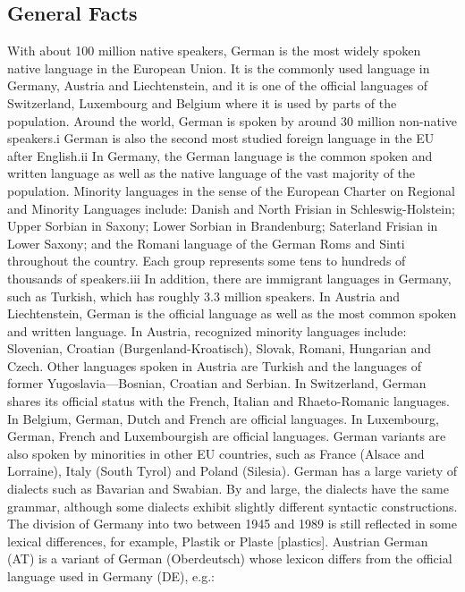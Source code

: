 \documentclass[]{../metanetpaper}
\begin{document}
	\subsection{General Facts}
With about 100 million native speakers, German is the most widely spoken native language in the European Union. It is the commonly used language in Germany, Austria and Liechtenstein, and it is one of the official languages of Switzerland, Luxembourg and Belgium where it is used by parts of the population.  Around the world, German is spoken by around 30 million non-native speakers.i German is also the second most studied foreign language in the EU after English.ii 
In Germany, the German language is the common spoken and written language as well as the native language of the vast majority of the population. Minority languages in the sense of the European Charter on Regional and Minority Languages include: Danish and North Frisian in Schleswig-Holstein; Upper Sorbian in Saxony; Lower Sorbian in Brandenburg; Saterland Frisian in Lower Saxony; and the Romani language of the German Roms and Sinti throughout the country. Each group represents some tens to hundreds of thousands of speakers.iii In addition, there are immigrant languages in Germany, such as Turkish, which has roughly 3.3 million speakers.
In Austria and Liechtenstein, German is the official language as well as the most common spoken and written language. In Austria, recognized minority languages include: Slovenian, Croatian (Burgenland-Kroatisch), Slovak, Romani, Hungarian and Czech. Other languages spoken in Austria are Turkish and the languages of former Yugoslavia—Bosnian, Croatian and Serbian.
In Switzerland, German shares its official status with the French, Italian and Rhaeto-Romanic languages. In Belgium, German, Dutch and French are official languages. In Luxembourg, German, French and Luxembourgish are official languages. German variants are also spoken by minorities in other EU countries, such as France (Alsace and Lorraine), Italy (South Tyrol) and Poland (Silesia).
German has a large variety of dialects such as Bavarian and Swabian. By and large, the dialects have the same grammar, although some dialects exhibit slightly different syntactic constructions. The division of Germany into two between 1945 and 1989 is still reflected in some lexical differences, for example, Plastik or Plaste [plastics].
Austrian German (AT) is a variant of German (Oberdeutsch) whose lexicon differs from the official language used in Germany (DE), e.g.: 
\end{document}
